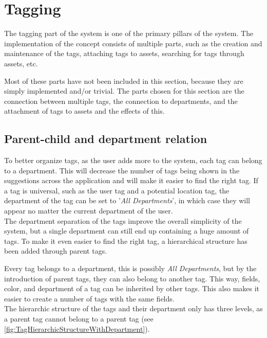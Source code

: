 \section{Tagging}
The tagging part of the system is one of the primary pillars of the system. The implementation of the concept consists of multiple parts, such as the creation and maintenance of the tags, attaching tags to assets, searching for tags through assets, etc.
\par
Most of these parts have not been included in this section, because they are simply implemented and/or trivial. The parts chosen for this section are the connection between multiple tags, the connection to departments, and the attachment of tags to assets and the effects of this.

\subsection{Parent-child and department relation}
To better organize tags, as the user adds more to the system, each tag can belong to a department. This will decrease the number of tags being shown in the suggestions across the application and will make it easier to find the right tag. If a tag is universal, such as the user tag and a potential location tag, the department of the tag can be set to '\textit{All Departments}', in which case they will appear no matter the current department of the user.\\
The department separation of the tags improve the overall simplicity of the system, but a single department can still end up containing a huge amount of tags. To make it even easier to find the right tag, a hierarchical structure has been added through parent tags.
\par
Every tag belongs to a department, this is possibly \textit{All Departments}, but by the introduction of parent tags, they can also belong to another tag. This way, fields, color, and department of a tag can be inherited by other tags. This also makes it easier to create a number of tags with the same fields.\\
The hierarchic structure of the tags and their department only has three levels, as a parent tag cannot belong to a parent tag (see \autoref{fig:TagHierarchicStructureWithDepartment}).

